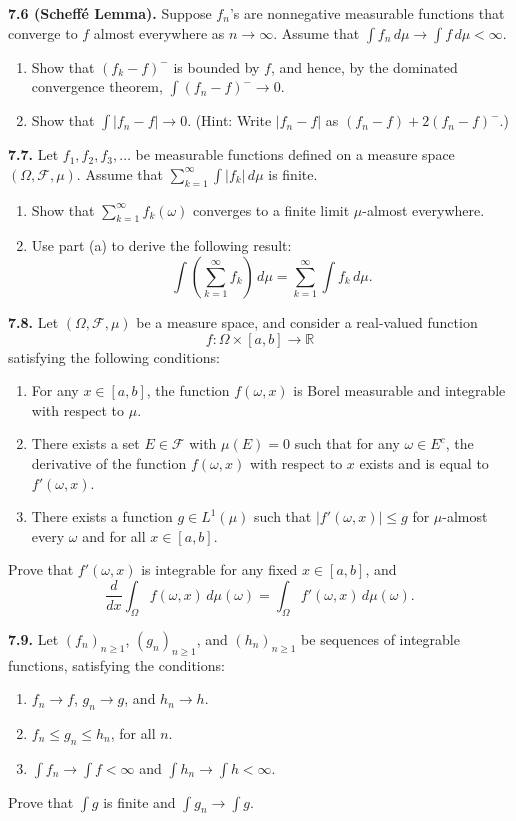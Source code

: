 \textbf{7.6 (Scheff\'e Lemma).} Suppose $f_n$'s are nonnegative measurable functions that converge to $f$ almost everywhere as $n\to\infty$. Assume that $\int f_n\, d\mu \to \int f\, d\mu < \infty$.
\begin{enumerate}[label=(\alph*)]
    \item Show that $(f_k-f)^-$ is bounded by $f$, and hence, by the dominated convergence theorem, $\int (f_n-f)^- \to 0$.
    \item Show that $\int |f_n-f|\to 0$. (Hint: Write $|f_n-f|$ as $(f_n-f)+2(f_n-f)^-$.)
\end{enumerate}

\textbf{7.7.} Let $f_1,f_2,f_3,\dots$ be measurable functions defined on a measure space $(\Omega,\mathcal{F},\mu)$. Assume that $\sum_{k=1}^{\infty} \int |f_k|\, d\mu$ is finite.
\begin{enumerate}[label=(\alph*)]
    \item Show that $\sum_{k=1}^{\infty} f_k(\omega)$ converges to a finite limit $\mu$-almost everywhere.
    \item Use part (a) to derive the following result:
    \[
    \int \left(\sum_{k=1}^{\infty} f_k\right)\, d\mu
    =
    \sum_{k=1}^{\infty} \int f_k\, d\mu.
    \]
\end{enumerate}

\textbf{7.8.} Let $(\Omega,\mathcal{F},\mu)$ be a measure space, and consider a real-valued function
\[
f:\Omega\times [a,b]\to \mathbb{R}
\]
satisfying the following conditions:
\begin{enumerate}[label=\arabic*.]
    \item For any $x\in [a,b]$, the function $f(\omega,x)$ is Borel measurable and integrable with respect to $\mu$.
    \item There exists a set $E\in \mathcal{F}$ with $\mu(E)=0$ such that for any $\omega \in E^c$, the derivative of the function $f(\omega,x)$ with respect to $x$ exists and is equal to $f'(\omega,x)$.
    \item There exists a function $g\in L^1(\mu)$ such that $|f'(\omega,x)|\le g$ for $\mu$-almost every $\omega$ and for all $x\in [a,b]$.
\end{enumerate}

Prove that $f'(\omega,x)$ is integrable for any fixed $x\in [a,b]$, and
\[
\frac{d}{dx}\int_{\Omega} f(\omega,x)\, d\mu(\omega)
=
\int_{\Omega} f'(\omega,x)\, d\mu(\omega).
\]

\textbf{7.9.} Let $(f_n)_{n\ge 1}$, $(g_n)_{n\ge 1}$, and $(h_n)_{n\ge 1}$ be sequences of integrable functions, satisfying the conditions:
\begin{enumerate}[label=\arabic*.]
    \item $f_n \to f$, $g_n \to g$, and $h_n \to h$.
    \item $f_n \le g_n \le h_n$, for all $n$.
    \item $\int f_n \to \int f < \infty$ and $\int h_n \to \int h < \infty$.
\end{enumerate}

Prove that $\int g$ is finite and $\int g_n \to \int g$.
